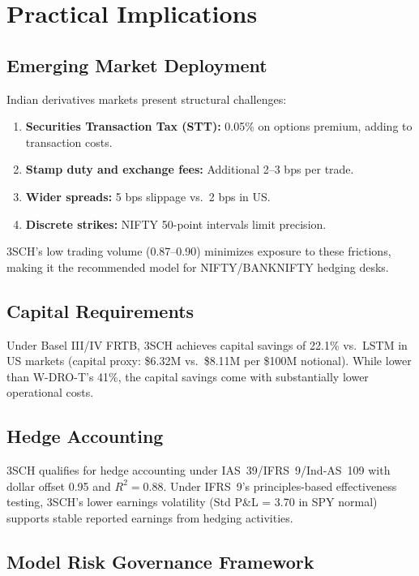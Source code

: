 \documentclass[11pt]{article}
\begin{document}
\section{Practical Implications}
\label{sec:implications}

\subsection{Emerging Market Deployment}

Indian derivatives markets present structural challenges:
\begin{enumerate}[noitemsep,leftmargin=*]
    \item \textbf{Securities Transaction Tax (STT):} 0.05\% on options premium, adding to transaction costs.
    \item \textbf{Stamp duty and exchange fees:} Additional 2--3 bps per trade.
    \item \textbf{Wider spreads:} 5 bps slippage vs.\ 2 bps in US.
    \item \textbf{Discrete strikes:} NIFTY 50-point intervals limit precision.
\end{enumerate}

3SCH's low trading volume (0.87--0.90) minimizes exposure to these frictions, making it the recommended model for NIFTY/BANKNIFTY hedging desks.

\subsection{Capital Requirements}

Under Basel III/IV FRTB, 3SCH achieves capital savings of 22.1\% vs.\ LSTM in US markets (capital proxy: \$6.32M vs.\ \$8.11M per \$100M notional). While lower than W-DRO-T's 41\%, the capital savings come with substantially lower operational costs.

\subsection{Hedge Accounting}

3SCH qualifies for hedge accounting under IAS~39/IFRS~9/Ind-AS~109 with dollar offset 0.95 and $R^2 = 0.88$. Under IFRS~9's principles-based effectiveness testing, 3SCH's lower earnings volatility (Std P\&L = 3.70 in SPY normal) supports stable reported earnings from hedging activities.

\subsection{Model Risk Governance Framework}
\end{document}
